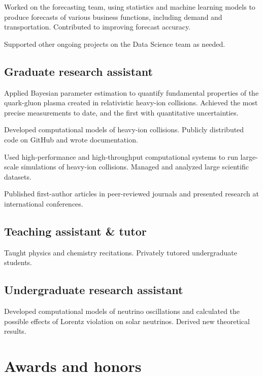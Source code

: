 \documentclass[letterpaper,10pt]{article}
\begin{document}
\begin{multicols}{2}
Worked on the forecasting team, using statistics and machine learning models to produce forecasts of various business functions, including demand and transportation.
Contributed to improving forecast accuracy.

Supported other ongoing projects on the Data Science team as needed.

\subsection{Graduate research assistant}

Applied Bayesian parameter estimation to quantify fundamental properties of the quark-gluon plasma created in relativistic heavy-ion collisions.
Achieved the most precise measurements to date, and the first with quantitative uncertainties.

Developed computational models of heavy-ion collisions.
Publicly distributed code on GitHub and wrote documentation.

Used high-performance and high-throughput computational systems to run large-scale simulations of heavy-ion collisions.
Managed and analyzed large scientific datasets.

Published first-author articles in peer-reviewed journals and presented research at international conferences.

\subsection{Teaching assistant \& tutor}

Taught physics and chemistry recitations.
Privately tutored undergraduate students.

\subsection{Undergraduate research assistant}

Developed computational models of neutrino oscillations and calculated the possible effects of Lorentz violation on solar neutrinos.
Derived new theoretical results.


\section{Awards and honors}


\end{multicols}
\end{document}
